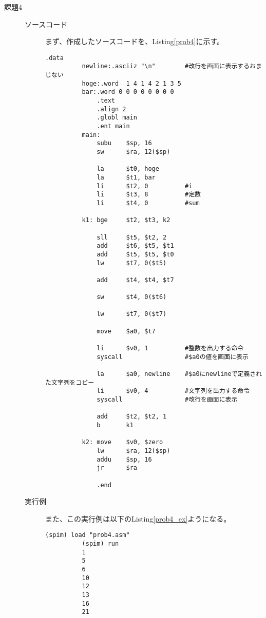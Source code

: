 \documentclass{jsarticle}
\begin{document}
\begin{description}
      \item[課題4]
      \begin{description}
          \item[ソースコード]
          まず、作成したソースコードを、Listing\ref{prob4}に示す。
          \begin{lstlisting}[caption=課題4のソースコード, label=prob4]
              .data
          newline:.asciiz "\n"        #改行を画面に表示するおまじない
          hoge:.word  1 4 1 4 2 1 3 5
          bar:.word 0 0 0 0 0 0 0 0
              .text
              .align 2
              .globl main
              .ent main
          main:
              subu    $sp, 16
              sw      $ra, 12($sp)

              la      $t0, hoge
              la      $t1, bar
              li      $t2, 0          #i
              li      $t3, 8          #定数
              li      $t4, 0          #sum

          k1: bge     $t2, $t3, k2

              sll     $t5, $t2, 2
              add     $t6, $t5, $t1
              add     $t5, $t5, $t0
              lw      $t7, 0($t5)

              add     $t4, $t4, $t7

              sw      $t4, 0($t6)

              lw      $t7, 0($t7)

              move    $a0, $t7

              li      $v0, 1          #整数を出力する命令
              syscall                 #$a0の値を画面に表示

              la      $a0, newline    #$a0にnewlineで定義された文字列をコピー
              li      $v0, 4          #文字列を出力する命令
              syscall                 #改行を画面に表示

              add     $t2, $t2, 1
              b       k1

          k2: move    $v0, $zero
              lw      $ra, 12($sp)
              addu    $sp, 16
              jr      $ra

              .end
          \end{lstlisting}

          \item[実行例]
          また、この実行例は以下のListing\ref{prob4_ex}ようになる。
          \begin{lstlisting}[caption=課題4の実行例, label=prob4_ex]
          (spim) load "prob4.asm"
          (spim) run
          1
          5
          6
          10
          12
          13
          16
          21
          \end{lstlisting}


\end{description}
\end{description}
\end{document}
